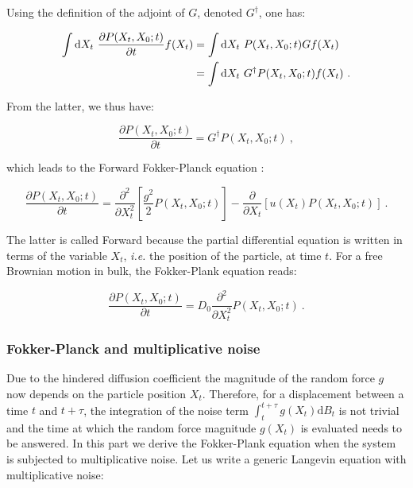 Using the definition of the adjoint of $G$, denoted $G ^\dagger$, one has:


\begin{equation}
	\begin{aligned}
		\int \textnormal{d} X_t ~\frac{\partial P(X_t, X_0 ; t) }{\partial t} f(X_t) &= \int \textnormal{d}X_t ~ P(X_t, X_0 ; t) G f(X_t) \\
		&= \int \textnormal{d}X_t ~  G ^\dagger P(X_t, X_0 ; t) f(X_t) ~.
	\end{aligned}
\end{equation}

From the latter, we thus have:

\begin{equation}
	\frac{\partial P(X_t, X_0 ; t)}{\partial t} = G^\dagger P(X_t, X_0 ; t) ~,
	\label{fokker3}
\end{equation}

which leads to the Forward Fokker-Planck equation \cite{del_moral_introduction_2010}:

\begin{equation}
	\frac{\partial P(X_t, X_0 ; t)}{\partial t }= \frac{\partial ^2}{\partial X_t^2} \left[\frac{g^2 }{2}P(X_t, X_0 ; t)\right] - \frac{\partial}{\partial X_t} \left[u(X_t) P(X_t, X_0 ; t)\right] ~.
	\label{Eq.Forward_Fokker_plank}
\end{equation}

The latter is called Forward because the partial differential equation is written in terms of the variable $X_t$, \textit{i.e.} the position of the particle, at time $t$. For a  free Brownian motion in bulk, the Fokker-Plank equation reads:

\begin{equation}
	\frac{\partial P(X_t, X_0 ; t)}{\partial t} = D_0 \frac{\partial ^2}{\partial X_t ^2}P(X_t, X_0 ; t) ~.
	\label{fp}
\end{equation}


\subsubsection{Fokker-Planck and multiplicative noise}

Due to the hindered diffusion coefficient the magnitude of the random force $g$ now depends on the particle position $X_t$. Therefore, for a displacement between a time $t$ and $t+\tau$, the integration of the noise term $\int_t ^{t+\tau}g(X_t)\mathrm{d}B_t$ is not trivial and the time at which the random force magnitude $g(X_t)$ is evaluated needs to be answered. In this part we derive the Fokker-Plank equation when the system is subjected to multiplicative noise. Let us write a generic Langevin equation with multiplicative noise:

